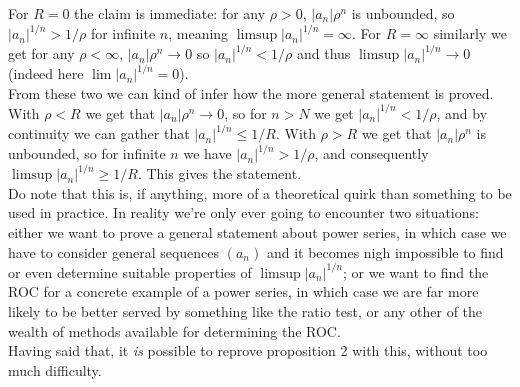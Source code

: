 \documentclass{tikzposter} %
\newtheorem{theorem}{Theorem}
\begin{document}
\begin{columns}
{  For $R = 0$ the claim is immediate: for any $\rho > 0$, $|a_{n}|\rho^{n}$ is unbounded, so $|a_{n}|^{1/n} > 1/\rho$ for infinite $n$, meaning $\limsup |a_{n}|^{1/n} = \infty$. For $R = \infty$ similarly we get for any $\rho < \infty$, $|a_{n}|\rho^{n} \to 0$ so $|a_{n}|^{1/n} < 1 / \rho$ and thus $\limsup |a_{n}|^{1/n} \to 0$ (indeed here $\lim |a_{n}|^{1/n} = 0$). \\

  From these two we can kind of infer how the more general statement is proved. With $\rho < R$ we get that
  $|a_{n}|\rho^{n} \to 0$, so for $n > N$ we get $|a_{n}|^{1/n} < 1/\rho$, and by continuity we can gather that $|a_{n}|^{1/n} \le 1/R$. With $\rho > R$ we get that $|a_{n}|\rho^{n}$ is unbounded, so for infinite $n$ we have $|a_{n}|^{1/n} > 1/\rho$, and consequently $\limsup |a_{n}|^{1/n} \ge 1/R$. This gives the statement. \\

  Do note that this is, if anything, more of a theoretical quirk than something to be used in practice. In reality we're only ever going to encounter two situations: either we want to prove a general statement about power series, in which case we have to consider general sequences $(a_{n})$ and it becomes nigh impossible to find or even determine suitable properties of $\limsup |a_{n}|^{1/n}$; or we want to find the ROC for a concrete example of a power series, in which case we are far more likely to be better served by something like the ratio test, or any other of the wealth of methods available for determining the ROC. \\

  Having said that, it \emph{is} possible to reprove proposition 2 with this, without too much difficulty.
  }

\end{columns}
\end{document}
